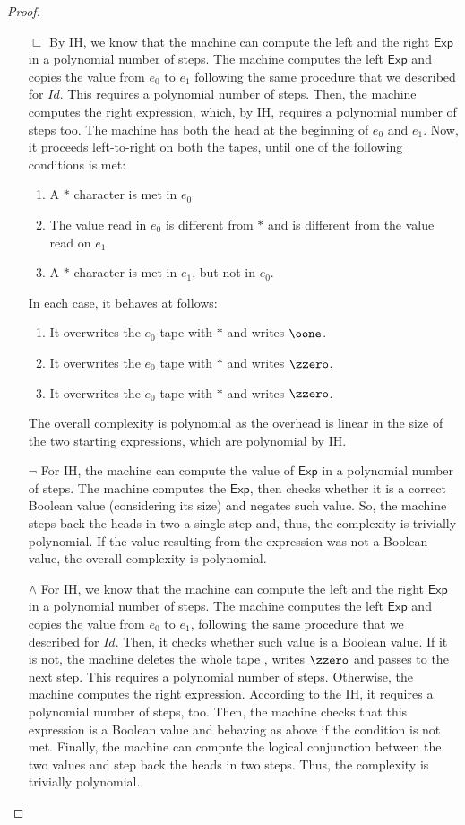 \begin{proof}
\begin{itemize}
\item[$\sqsubseteq$]
By IH, we know that the machine can compute
the left and the right
$\mathsf{Exp}$ in a polynomial number of steps.
The machine computes the
left $\mathsf{Exp}$
and copies the value from $e_0$ to $e_1$
following the same procedure that we described for $Id$.
%
This requires a polynomial number of steps.
Then, the machine computes
the right expression, which,
by IH, requires a polynomial number of steps too.
The machine has both the head at the beginning
of $e_0$ and $e_1$.
Now, it proceeds left-to-right on both the tapes,
until one of the following conditions is met:
\begin{enumerate}
\itemsep0em
\item A $*$ character is met in $e_0$
\item The value read in $e_0$ is different from
$*$ and is different from the value read on $e_1$
\item A $*$ character is met in $e_1$, but not in $e_0$.
\end{enumerate}
In each case, it behaves at follows:
\begin{enumerate}
\itemsep0em
\item It overwrites the $e_0$ tape with $*$
and writes ${\oone}$.
\item It overwrites the $e_0$ tape with
$*$ and writes ${\zzero}$.
\item It overwrites the $e_0$ tape
with $*$ and writes {$\zzero$}.
\end{enumerate}
The overall complexity is polynomial as
the overhead is linear in the size
of the two starting expressions, which
are polynomial by IH.

\item[$\neg$] For IH, the machine can compute
the value of $\mathsf{Exp}$ in a polynomial number
of steps.
The machine computes the $\mathsf{Exp}$,
then checks whether it is a correct Boolean value
(considering its size) and
negates such value.
So, the machine steps back the
heads {in two a single step}
and, thus, the complexity is trivially polynomial.
{If the value resulting from
the expression was not a Boolean value},
the overall complexity is
polynomial.

\item[$\wedge$] For IH, we know that the machine
can compute the
left and the right $\mathsf{Exp}$
in a polynomial number of steps.
The machine computes the left $\mathsf{Exp}$
and copies the value from $e_0$ to $e_1$,
following the same procedure that we
described for $Id$.
Then, it checks whether such value is a Boolean
{value}.
If it is not, the machine deletes the whole tape
{,} writes {$\zzero$}
and passes to the next step.
This requires a polynomial number of steps.
Otherwise, the machine computes the right
expression.
According to the IH, it requires
a polynomial number of steps, too.
Then, the machine checks that
this expression is a Boolean value and behaving
as above if the condition is not met.
Finally, the machine can compute the logical conjunction
between the two values and
step back the heads in two steps.
Thus, the complexity is trivially polynomial.
\end{itemize}


\end{proof}
